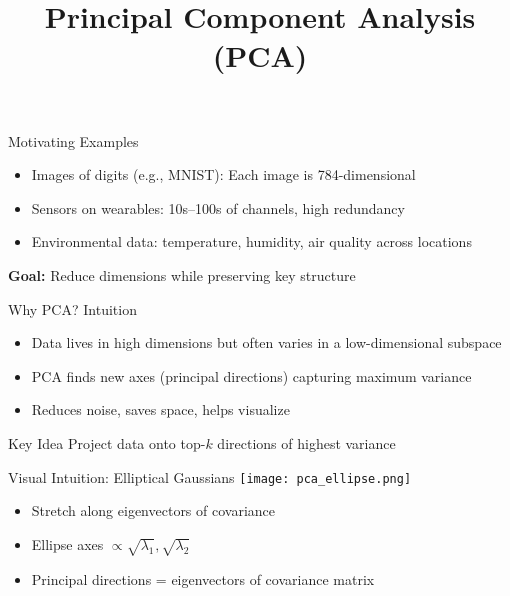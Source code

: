 \documentclass{beamer}
\title{Principal Component Analysis (PCA)}
\author{}
\date{}
\begin{document}
\frame{\titlepage}

\begin{frame}{Motivating Examples}
\begin{itemize}
    \item Images of digits (e.g., MNIST): Each image is 784-dimensional
    \item Sensors on wearables: 10s–100s of channels, high redundancy
    \item Environmental data: temperature, humidity, air quality across locations
\end{itemize}
\vspace{1em}
\pause
\textbf{Goal:} Reduce dimensions while preserving key structure
\end{frame}


\begin{frame}{Why PCA? Intuition}
\begin{itemize}
    \item Data lives in high dimensions but often varies in a low-dimensional subspace
    \item PCA finds new axes (principal directions) capturing maximum variance
    \item Reduces noise, saves space, helps visualize
\end{itemize}
\vspace{1em}
\pause
\begin{block}{Key Idea}
Project data onto top-\(k\) directions of highest variance
\end{block}
\end{frame}


\begin{frame}{Visual Intuition: Elliptical Gaussians}
\centering
\texttt{[image: pca\_ellipse.png]} %
\vspace{1em}
\begin{itemize}
    \item Stretch along eigenvectors of covariance
    \item Ellipse axes \( \propto \sqrt{\lambda_1}, \sqrt{\lambda_2} \)
    \item Principal directions = eigenvectors of covariance matrix
\end{itemize}
\end{frame}
\end{document}
